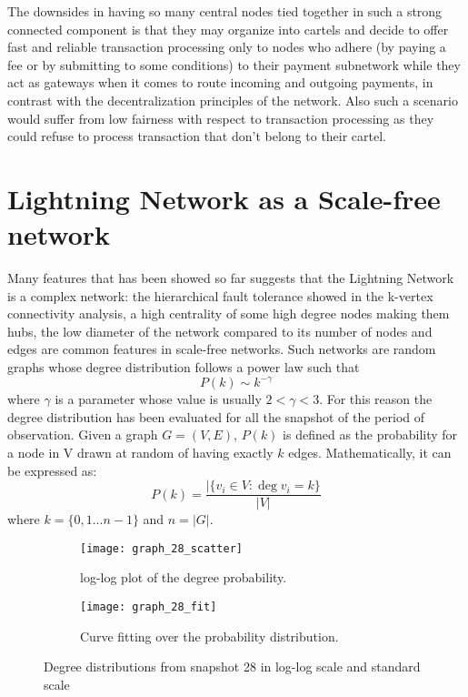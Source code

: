 	The downsides in having so many central nodes tied together in such a strong connected component is that they may organize into cartels and decide to offer fast and reliable transaction processing only to nodes who adhere (by paying a fee or by submitting to some conditions) to their payment subnetwork while they act as gateways when it comes to route incoming and outgoing payments, in contrast with the decentralization principles of the network. Also such a scenario would suffer from low fairness with respect to transaction processing as they could refuse to process transaction that don't belong to their cartel.

	\section{Lightning Network as a Scale-free network}
	
	Many features that has been showed so far suggests that the Lightning Network is a complex network: the hierarchical fault tolerance showed in the k-vertex connectivity analysis, a high centrality of some high degree nodes making them hubs, the low diameter of the network compared to its number of nodes and edges are common features in scale-free networks. Such networks are random graphs whose degree distribution follows a power law such that 
	$$P(k) \sim k^{-\gamma}$$
	where $\gamma$ is a parameter whose value is usually $2 < \gamma < 3$. For this reason the degree distribution has been evaluated for all the snapshot of the period of observation. Given a graph $G = (V,E)$, $P(k)$ is defined as the probability for a node in V drawn at random of having exactly $k$ edges. Mathematically, it can be expressed as:
	$$P(k) = \frac{|\{ v_i \in V : \deg v_i = k \}}{|V|}$$
	where $k = \{0,1 ... n - 1\}$ and $n = |G|$. 
	
	\begin{figure}
	\centering
	\begin{subfigure}{\textwidth}
		\centering
		\texttt{[image: graph\_28\_scatter]}
		\caption{log-log plot of the degree probability.}
		\label{graph_28_scatter}
	\end{subfigure}
	\begin{subfigure}{\textwidth}
		\centering
		\texttt{[image: graph\_28\_fit]}
		\caption{Curve fitting over the probability distribution.}
		\label{graph_28_degree}
	\end{subfigure}
		\caption{Degree distributions from snapshot 28 in log-log scale and standard scale}
	\end{figure}
	
